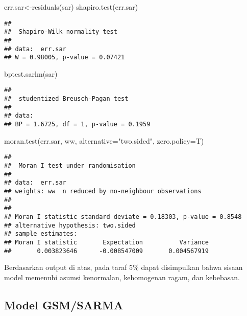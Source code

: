 \documentclass[
]{book}
\newenvironment{Shaded}{\begin{snugshade}}{\end{snugshade}}
\newcommand{\AttributeTok}[1]{\textcolor[rgb]{0.77,0.63,0.00}{#1}}
\newcommand{\FunctionTok}[1]{\textcolor[rgb]{0.00,0.00,0.00}{#1}}
\newcommand{\NormalTok}[1]{#1}
\newcommand{\OtherTok}[1]{\textcolor[rgb]{0.56,0.35,0.01}{#1}}
\newcommand{\StringTok}[1]{\textcolor[rgb]{0.31,0.60,0.02}{#1}}
\begin{document}
\begin{Shaded}
\begin{Highlighting}[]
\NormalTok{err.sar}\OtherTok{\textless{}{-}}\FunctionTok{residuals}\NormalTok{(sar)}
\FunctionTok{shapiro.test}\NormalTok{(err.sar)}
\end{Highlighting}
\end{Shaded}

\begin{verbatim}
## 
##  Shapiro-Wilk normality test
## 
## data:  err.sar
## W = 0.98005, p-value = 0.07421
\end{verbatim}

\begin{Shaded}
\begin{Highlighting}[]
\FunctionTok{bptest.sarlm}\NormalTok{(sar)}
\end{Highlighting}
\end{Shaded}

\begin{verbatim}
## 
##  studentized Breusch-Pagan test
## 
## data:  
## BP = 1.6725, df = 1, p-value = 0.1959
\end{verbatim}

\begin{Shaded}
\begin{Highlighting}[]
\FunctionTok{moran.test}\NormalTok{(err.sar, ww, }\AttributeTok{alternative=}\StringTok{"two.sided"}\NormalTok{, }\AttributeTok{zero.policy=}\NormalTok{T)}
\end{Highlighting}
\end{Shaded}

\begin{verbatim}
## 
##  Moran I test under randomisation
## 
## data:  err.sar  
## weights: ww  n reduced by no-neighbour observations
##   
## 
## Moran I statistic standard deviate = 0.18303, p-value = 0.8548
## alternative hypothesis: two.sided
## sample estimates:
## Moran I statistic       Expectation          Variance 
##       0.003823646      -0.008547009       0.004567919
\end{verbatim}

Berdasarkan output di atas, pada taraf 5\% dapat disimpulkan bahwa sisaan model memenuhi asumsi kenormalan, kehomogenan ragam, dan kebebasan.

\hypertarget{model-gsmsarma}{%
\subsection{Model GSM/SARMA}\label{model-gsmsarma}}
\end{document}
